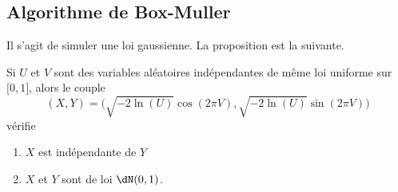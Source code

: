 \subsection{Algorithme de Box-Muller}

Il s'agit de simuler une loi gaussienne. La proposition est la suivante.

\begin{proposition}
    Si \( U\) et \( V\) sont des variables aléatoires indépendantes de même loi uniforme sur \( \mathopen[ 0 , 1 \mathclose]\), alors le couple
    \begin{equation}
        (X,Y)=\big( \sqrt{-2\ln(U)}\cos(2\pi V),\sqrt{-2\ln(U)}\sin(2\pi V) \big)
    \end{equation}
    vérifie
    \begin{enumerate}
        \item
            \( X\) est indépendante de \( Y\)
        \item
            \( X\) et \( Y\) sont de loi \( \dN(0,1)\).
    \end{enumerate}
\end{proposition}

